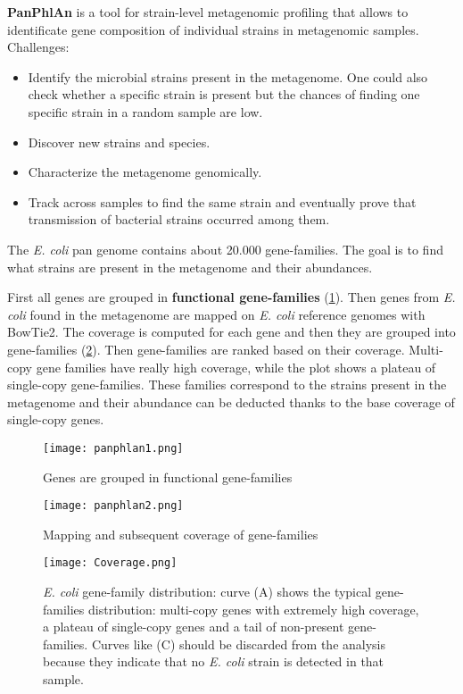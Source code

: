 \textbf{PanPhlAn} is a tool for strain-level metagenomic profiling that allows to identificate gene composition of individual strains in metagenomic samples.\\ 

Challenges:
\begin{itemize}
    \item Identify the microbial strains present in the metagenome. One could also check whether a specific strain is present but the chances of finding one specific strain in a random sample are low.
    \item Discover new strains and species.
    \item Characterize the metagenome genomically.
    \item Track across samples to find the same strain and eventually prove that transmission of bacterial strains occurred among them.
\end{itemize}

The \emph{E. coli} pan genome contains about 20.000 gene-families. The goal is to find what strains are present in the metagenome and their abundances.

First all genes are grouped in \textbf{functional gene-families} (\ref{fig:pan1}). Then genes from \emph{E. coli} found in the metagenome are mapped on \emph{E. coli} reference genomes with BowTie2. The coverage is computed for each gene and then they are grouped into gene-families (\ref{fig:pan2}). Then gene-families are ranked based on their coverage. Multi-copy gene families have really high coverage, while the plot shows a plateau of single-copy gene-families. These families correspond to the strains present in the metagenome and their abundance can be deducted thanks to the base coverage of single-copy genes. 

\begin{figure}[!h]
\centering
\texttt{[image: panphlan1.png]}
\caption{\label{fig:pan1}Genes are grouped in functional gene-families}
\end{figure}

\begin{figure}[!h]
\centering
\texttt{[image: panphlan2.png]}
\caption{\label{fig:pan2}Mapping and subsequent coverage of gene-families}
\end{figure}

\begin{figure}[!h]
\centering
\texttt{[image: Coverage.png]}
\caption{\label{fig:pan3}\emph{E. coli} gene-family distribution: curve (A) shows the typical gene-families distribution: multi-copy genes with extremely high coverage, a plateau of single-copy genes and a tail of non-present gene-families. Curves like (C) should be discarded from the analysis because they indicate that no \emph{E. coli} strain is detected in that sample.}
\end{figure}


